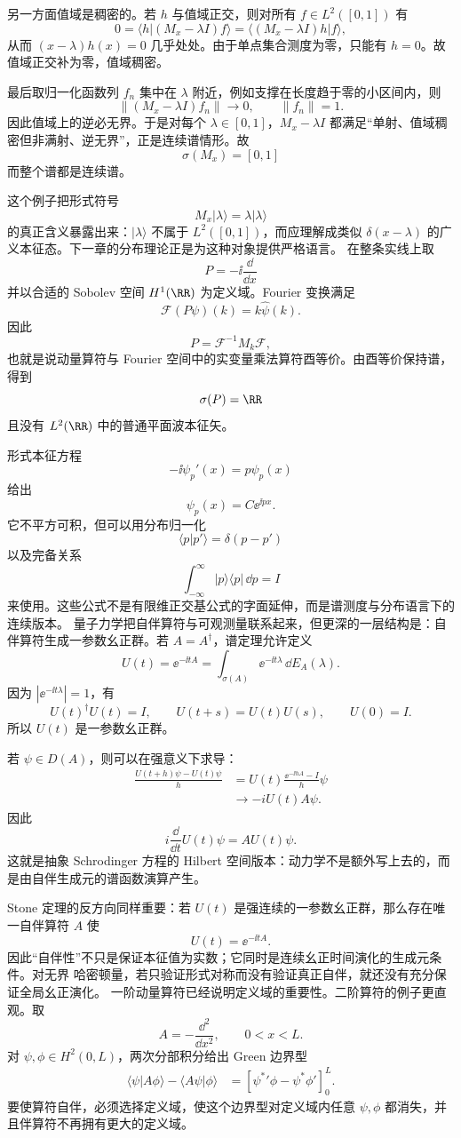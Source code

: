 另一方面值域是稠密的。若 $h$ 与值域正交，则对所有 $f\in L^2([0,1])$ 有
\[
0=\langle h|(M_x-\lambda I)f\rangle
=\langle (M_x-\lambda I)h|f\rangle,
\]
从而 $(x-\lambda)h(x)=0$ 几乎处处。由于单点集合测度为零，只能有 $h=0$。故值域正交补为零，值域稠密。

最后取归一化函数列 $f_n$ 集中在 $\lambda$ 附近，例如支撑在长度趋于零的小区间内，则
\[
\|(M_x-\lambda I)f_n\|\to0,
\qquad \|f_n\|=1.
\]
因此值域上的逆必无界。于是对每个 $\lambda\in[0,1]$，$M_x-\lambda I$ 都满足“单射、值域稠密但非满射、逆无界”，正是连续谱情形。故
\[
{\sigma(M_x)=[0,1]}
\]
而整个谱都是连续谱。

这个例子把形式符号
\[
M_x|\lambda\rangle=\lambda|\lambda\rangle
\]
的真正含义暴露出来：$|\lambda\rangle$ 不属于 $L^2([0,1])$，而应理解成类似 $\delta(x-\lambda)$ 的广义本征态。下一章的分布理论正是为这种对象提供严格语言。
在整条实线上取
\[
P=-\ii\frac{\dd}{\dd x}
\]
并以合适的 Sobolev 空间 $H^1(\RR)$ 为定义域。Fourier 变换满足
\[
\mathcal F(P\psi)(k)=k\widehat\psi(k).
\]
因此
\[
P=\mathcal F^{-1}M_k\mathcal F,
\]
也就是说动量算符与 Fourier 空间中的实变量乘法算符酉等价。由酉等价保持谱，得到
\[
{\sigma(P)=\RR}
\]
且没有 $L^2(\RR)$ 中的普通平面波本征矢。

形式本征方程
\[
-\ii\psi_p'(x)=p\psi_p(x)
\]
给出
\[
\psi_p(x)=C \ee^{\ii px}.
\]
它不平方可积，但可以用分布归一化
\[
\langle p|p'\rangle=\delta(p-p')
\]
以及完备关系
\[
\int_{-\infty}^{\infty}|p\rangle\langle p|\,\dd p=I
\]
来使用。这些公式不是有限维正交基公式的字面延伸，而是谱测度与分布语言下的连续版本。
量子力学把自伴算符与可观测量联系起来，但更深的一层结构是：自伴算符生成一参数幺正群。若 $A=A^\dagger$，谱定理允许定义
\[
U(t)=\ee^{-\ii tA}
=\int_{\sigma(A)}\ee^{-\ii t\lambda}\,\dd E_A(\lambda).
\]
因为 $|\ee^{-\ii t\lambda}|=1$，有
\[
U(t)^\dagger U(t)=I,
\qquad
U(t+s)=U(t)U(s),
\qquad
U(0)=I.
\]
所以 $U(t)$ 是一参数幺正群。

若 $\psi\in D(A)$，则可以在强意义下求导：
\[
\begin{aligned}
\frac{U(t+h)\psi-U(t)\psi}{h}
&=U(t)\frac{\ee^{-\ii hA}-I}{h}\psi\\
&\longrightarrow -iU(t)A\psi.
\end{aligned}
\]
因此
\begin{equation*}{
i\frac{\dd}{\dd t}U(t)\psi=A U(t)\psi
}.\end{equation*}
这就是抽象 Schrodinger 方程的 Hilbert 空间版本：动力学不是额外写上去的，而是由自伴生成元的谱函数演算产生。

Stone 定理的反方向同样重要：若 $U(t)$ 是强连续的一参数幺正群，那么存在唯一自伴算符 $A$ 使
\[
U(t)=\ee^{-\ii tA}.
\]
因此“自伴性”不只是保证本征值为实数；它同时是连续幺正时间演化的生成元条件。对无界 哈密顿量，若只验证形式对称而没有验证真正自伴，就还没有充分保证全局幺正演化。
一阶动量算符已经说明定义域的重要性。二阶算符的例子更直观。取
\[
A=-\frac{\dd^2}{\dd x^2},
\qquad 0<x<L.
\]
对 $\psi,\phi\in H^2(0,L)$，两次分部积分给出 Green 边界型
\[
\begin{aligned}
\langle\psi|A\phi\rangle-\langle A\psi|\phi\rangle
&=\left[\psi^*{}'\phi-\psi^*\phi'\right]_{0}^{L}.
\end{aligned}
\]
要使算符自伴，必须选择定义域，使这个边界型对定义域内任意 $\psi,\phi$ 都消失，并且伴算符不再拥有更大的定义域。

